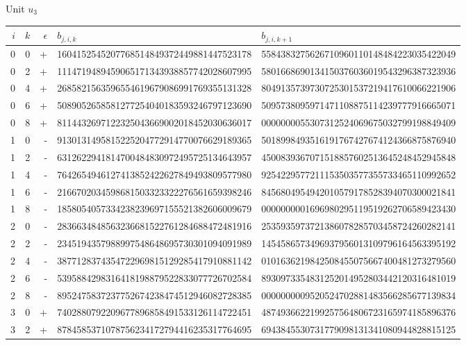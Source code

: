 \par\medskip\normalfont\normalsize Unit $u_3$\par\smallskip
\fontsize{7.6}{9.2}\selectfont\ttfamily
\begin{longtable}{rrrll}
$i$ & $k$ & $\epsilon$ & $b_{j,i,k}$ & $b_{j,i,k+1}$ \\ \hline\endhead
0 & 0 & + & 1604152545207768514849372449881447523178 & 5584383275626710960110148484223035422049 \\
0 & 2 & + & 1114719489459065171343938857742028607995 & 5801668690134150376036019543296387323936 \\
0 & 4 & + & 2685821563596554619679086991769355131328 & 8049135739730725301537219417610066221906 \\
0 & 6 & + & 5089052658581277254040183593246797123690 & 5095738095971471108875114239777916665071 \\
0 & 8 & + & 8114432697122325043669002018452030636017 & 0000000055307312524069675032799198849409 \\
1 & 0 & - & 9130131495815225204772914770076629189365 & 5018998493516191767427674124366875876940 \\
1 & 2 & - & 6312622941814700484830972495725134643957 & 4500839367071518857602513645248452945848 \\
1 & 4 & - & 7642654946127413852422627849493809577980 & 9254229577211153503577355733465110992652 \\
1 & 6 & - & 2166702034598681503323322276561659398246 & 8456804954942010579178528394070300021841 \\
1 & 8 & - & 1858054057334238239697155521382606009679 & 0000000001696980295119519262706589423430 \\
2 & 0 & - & 2836634848563236681522761284688472481916 & 2535935973721386078285703458724260282141 \\
2 & 2 & - & 2345194357988997548648695730301094091989 & 1454586573496937956013109796164563395192 \\
2 & 4 & - & 3877128374354722969815129285417910881142 & 0101636219842508455075667400481273279560 \\
2 & 6 & - & 5395884298316418198879522833077726702584 & 8930973354831252014952803442120316481019 \\
2 & 8 & - & 8952475837237752674238474512946082728385 & 0000000009520524702881483566285677139834 \\
3 & 0 & + & 7402880792209677896858491533126114722451 & 4874936622199257564806723165974185896376 \\
3 & 2 & + & 8784585371078756234172794416235317764695 & 6943845530731779098131341080944828815125 \\

\end{longtable}
